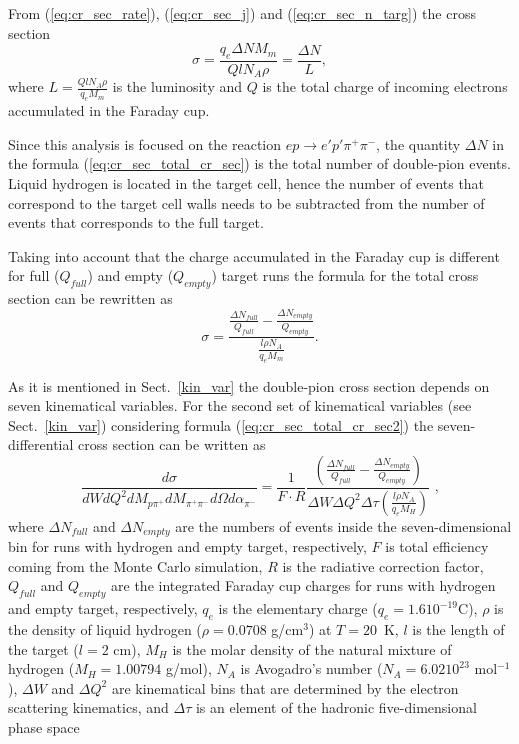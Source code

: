 From (\ref{eq:cr_sec_rate}), (\ref{eq:cr_sec_j}) and (\ref{eq:cr_sec_n_targ}) the cross section
\begin{equation}
\sigma =\frac{q_{e}\Delta NM_{m}}{QlN_{A}\rho }=\frac{\Delta N}{L},
\label{eq:cr_sec_total_cr_sec}
\end{equation}  
where $L=\frac{QlN_{A}\rho }{q_{e}M_{m}}$ is the luminosity and $Q$ is the total charge of incoming electrons accumulated in the Faraday cup.

Since this analysis is focused on the reaction $e p \rightarrow e' p' \pi^{+} \pi^{-}$, the quantity  $\Delta N$ in the formula (\ref{eq:cr_sec_total_cr_sec}) is the total number of double-pion events. Liquid hydrogen is located in the target cell, hence the number of events that correspond to the target cell walls needs to be subtracted from the number of events that corresponds to the full target. 

Taking into account that the charge accumulated in the Faraday cup is different for full ($Q_{full}$) and empty ($Q_{empty}$) target runs the formula for the total  cross section can be rewritten as
\begin{equation}
\sigma =\frac{\frac{\Delta N_{full}}{Q_{full}}- \frac{\Delta N_{empty}}{Q_{empty}}}{\frac{l\rho N_{A}}{q_{e}M_{m}}}.
\label{eq:cr_sec_total_cr_sec2}
\end{equation}  

As it is mentioned in Sect.~\ref{kin_var} the double-pion cross section depends on seven kinematical variables. 
For the second set of kinematical
variables (see Sect.~\ref{kin_var}) considering formula (\ref{eq:cr_sec_total_cr_sec2}) the seven-differential cross section can be
written as 
\begin{equation}
\frac{d\sigma}{dWdQ^{2}dM_{p\pi^{+}}dM_{\pi^{+}\pi^{-}}d\Omega
d\alpha_{\pi^{-}}} = \frac{1}{F \cdot R} 
\frac{\left( \frac{\Delta N_{full}}{Q_{full}}-\frac{\Delta N_{empty}}{Q_{empty}} \right)}{
\Delta W \Delta Q^{2} \Delta \tau \left( \frac{l \rho N_{A}}{q_{e}M_{H}} \right)} \textrm{ ,}
\label{expcrossect}
\end{equation}
where $\Delta N_{full}$ and $\Delta N_{empty}$ are the numbers of events inside the
seven-dimensional bin for runs with hydrogen and
empty target, respectively, $F$ is total efficiency
 coming from the  Monte Carlo simulation,
$R$ is the
radiative correction factor,  $Q_{full}$ and $Q_{empty}$ are the integrated Faraday cup charges for runs with hydrogen and empty target, respectively, $q_{e}$ is the elementary charge ($q_{e} =1.610^{-19} $C), $\rho$ is the density of liquid hydrogen ($\rho = 0.0708 $ g/cm$^{3}$) at $T = 20$~K,
$l$ is the length of the target ($l = 2$ cm), $M_{H}$ is the molar density of
the natural mixture of hydrogen ($M_{H} = 1.00794$ g/mol),  $N_{A}$ is Avogadro's
number ($N_{A} =6.0210^{23}$ mol$^{-1}$),  $\Delta
W$ and $ \Delta Q^{2}$ are kinematical bins that are determined by the electron
scattering
 kinematics, and $\Delta \tau$ is an element of the
 hadronic five-dimensional phase space

